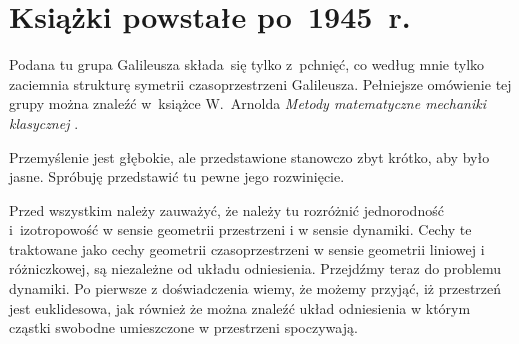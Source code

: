 \documentclass[a4paper,11pt]{article}
\begin{document}
\vspace{\spaceTwo}











\newpage

\section{Książki powstałe po~1945~r.}

\vspace{\spaceTwo}




\vspace{0em}



\vspace{0em}


\noindent
{} Podana tu grupa Galileusza składa~się tylko z~pchnięć,
co według mnie tylko zaciemnia strukturę symetrii czasoprzestrzeni
Galileusza. Pełniejsze omówienie tej grupy można znaleźć w~książce
W.~Arnolda \textit{Metody matematyczne mechaniki klasycznej}
\cite{ArnoldMetodyMatematyczneMechanikiKlasycznej1981}.

\vspace{\spaceFour}





\noindent
{} Przemyślenie jest głębokie, ale przedstawione
stanowczo zbyt krótko, aby było jasne. Spróbuję przedstawić tu pewne
jego rozwinięcie.

Przed wszystkim należy zauważyć, że należy tu rozróżnić jednorodność
i~izotropowość w sensie geometrii przestrzeni i w sensie dynamiki.
Cechy te traktowane jako cechy geometrii czasoprzestrzeni w sensie
geometrii liniowej i różniczkowej, są niezależne od układu
odniesienia. Przejdźmy teraz do problemu dynamiki. Po pierwsze z
doświadczenia wiemy, że możemy przyjąć, iż przestrzeń jest
euklidesowa, jak również że można znaleźć układ odniesienia w którym
cząstki swobodne umieszczone w przestrzeni spoczywają.
\end{document}
